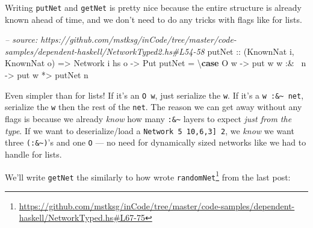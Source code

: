 \documentclass[]{article}
\newenvironment{Shaded}{}{}
\newcommand{\KeywordTok}[1]{\textcolor[rgb]{0.00,0.44,0.13}{\textbf{{#1}}}}
\newcommand{\DataTypeTok}[1]{\textcolor[rgb]{0.56,0.13,0.00}{{#1}}}
\newcommand{\CommentTok}[1]{\textcolor[rgb]{0.38,0.63,0.69}{\textit{{#1}}}}
\newcommand{\OtherTok}[1]{\textcolor[rgb]{0.00,0.44,0.13}{{#1}}}
\newcommand{\FunctionTok}[1]{\textcolor[rgb]{0.02,0.16,0.49}{{#1}}}
\newcommand{\NormalTok}[1]{{#1}}
\renewcommand{\href}[2]{#2\footnote{\url{#1}}}
\begin{document}
Writing \texttt{putNet} and \texttt{getNet} is pretty nice because the entire
structure is already known ahead of time, and we don't need to do any tricks
with flags like for lists.

\begin{Shaded}
\begin{Highlighting}[]
\CommentTok{-- source: https://github.com/mstksg/inCode/tree/master/code-samples/dependent-haskell/NetworkTyped2.hs#L54-58}
\OtherTok{putNet ::} \NormalTok{(}\DataTypeTok{KnownNat} \NormalTok{i, }\DataTypeTok{KnownNat} \NormalTok{o)}
       \OtherTok{=>} \DataTypeTok{Network} \NormalTok{i hs o}
       \OtherTok{->} \DataTypeTok{Put}
\NormalTok{putNet }\FunctionTok{=} \NormalTok{\textbackslash{}}\KeywordTok{case} \DataTypeTok{O} \NormalTok{w     }\OtherTok{->} \NormalTok{put w}
               \NormalTok{w }\FunctionTok{:&~} \NormalTok{n }\OtherTok{->} \NormalTok{put w }\FunctionTok{*>} \NormalTok{putNet n}
\end{Highlighting}
\end{Shaded}

Even simpler than for lists! If it's an \texttt{O\ w}, just serialize the
\texttt{w}. If it's a \texttt{w\ :\&\textasciitilde{}\ net}, serialize the
\texttt{w} then the rest of the \texttt{net}. The reason we can get away without
any flags is because we already \emph{know} how many
\texttt{:\&\textasciitilde{}} layers to expect \emph{just from the type}. If we
want to deserialize/load a
\texttt{Network\ 5\ \textquotesingle{}{[}10,6,3{]}\ 2}, we \emph{know} we want
three \texttt{(:\&\textasciitilde{})}'s and one \texttt{O} --- no need for
dynamically sized networks like we had to handle for lists.

We'll write \texttt{getNet} the similarly to how wrote
\href{https://github.com/mstksg/inCode/tree/master/code-samples/dependent-haskell/NetworkTyped.hs\#L67-75}{\texttt{randomNet}}
from the last post:

\begin{Shaded}
\end{Shaded}
\end{document}
